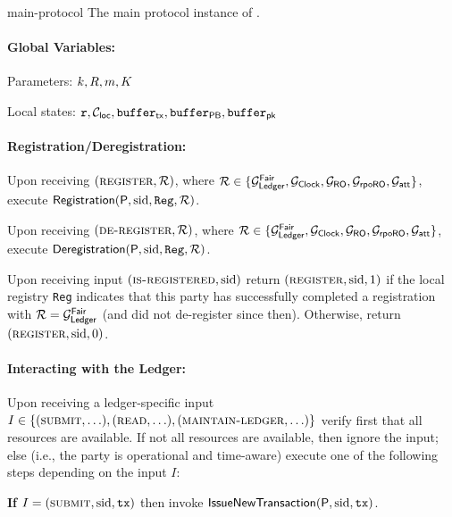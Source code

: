 \begin{cccProtocol}
    {\protocFairLedger}
    {main-protocol}
    {The main protocol instance of \protocFairLedger.}
    
    \paragraph{Global Variables:}
    \begin{cccItemize}[nosep]
        \item Parameters: $k, R, m, K$
        
        \item Local states: $\mathtt{r}, \mathcal{C}_{\mathsf{loc}}, \mathtt{buffer}_{\mathsf{tx}}, \mathtt{buffer}_\mathsf{PB}, \mathtt{buffer}_\mathsf{pk}$
    \end{cccItemize}

    \paragraph{Registration/Deregistration:}
    \begin{cccItemize}[nosep]
        \item Upon receiving $(\textsc{register}, \mathcal{R})$, where $\mathcal{R} \in \{ \mathcal{G}^{\mathsf{Fair}}_{\mathsf{Ledger}}, \mathcal{G}_{\mathsf{Clock}}, \mathcal{G}_{\mathsf{RO}}, \mathcal{G}_{\mathsf{rpoRO}}, \mathcal{G}_{\mathsf{att}} \}$, execute $\mathsf{Registration}(\mathsf{P}, \mathrm{sid}, \mathtt{Reg}, \mathcal{R})$.

        \item Upon receiving $(\textsc{de-register}, \mathcal{R})$, where $\mathcal{R} \in \{ \mathcal{G}^{\mathsf{Fair}}_{\mathsf{Ledger}}, \mathcal{G}_{\mathsf{Clock}}, \mathcal{G}_{\mathsf{RO}}, \mathcal{G}_{\mathsf{rpoRO}}, \mathcal{G}_{\mathsf{att}}\}$, execute $\mathsf{Deregistration}(\mathsf{P}, \mathrm{sid}, \mathtt{Reg}, \mathcal{R})$.

        \item Upon receiving input $(\textsc{is-registered}, \mathrm{sid})$ return $(\textsc{register}, \mathrm{sid}, 1)$ if the local registry \texttt{Reg} indicates that this party has successfully completed a registration with $\mathcal{R} = \mathcal{G}^{\mathsf{Fair}}_{\mathsf{Ledger}}$ (and did not de-register since then).
        Otherwise, return $(\textsc{register}, \mathrm{sid}, 0)$.
    \end{cccItemize}

    \paragraph{Interacting with the Ledger:}
    Upon receiving a ledger-specific input $I \in \{(\textsc{submit}, \ldots),\allowbreak (\textsc{read}, \ldots), (\textsc{maintain-ledger}, \ldots) \}$ verify first that all resources are available.
    If not all resources are available, then ignore the input; else (i.e., the party is operational and time-aware) execute one of the following steps depending on the input $I$:
    \begin{cccItemize}[nosep]
        \item \textbf{If} $I = (\textsc{submit}, \mathrm{sid}, \mathtt{tx})$ then invoke $\mathsf{IssueNewTransaction(\mathsf{P}, \mathrm{sid}, \mathtt{tx})}$.


\end{cccItemize}
\end{cccProtocol}
